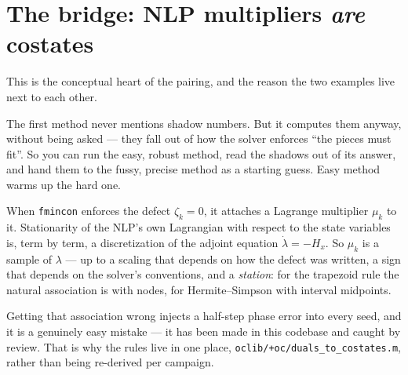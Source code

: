 \documentclass[11pt]{article}
\newcommand{\file}[1]{\texttt{#1}}
\begin{document}
\section{The bridge: NLP multipliers \emph{are} costates}\label{sec:bridge}

This is the conceptual heart of the pairing, and the reason the two examples
live next to each other.

\begin{eli}
The first method never mentions shadow numbers. But it computes them anyway,
without being asked --- they fall out of how the solver enforces ``the pieces
must fit''. So you can run the easy, robust method, read the shadows out of its
answer, and hand them to the fussy, precise method as a starting guess. Easy
method warms up the hard one.
\end{eli}

\begin{intu}
When \texttt{fmincon} enforces the defect $\zeta_k=0$, it attaches a Lagrange
multiplier $\mu_k$ to it. Stationarity of the NLP's own Lagrangian with respect
to the state variables is, term by term, a discretization of the adjoint
equation $\dot\lambda=-H_x$. So $\mu_k$ is a sample of $\lambda$ --- up to a
scaling that depends on how the defect was written, a sign that depends on the
solver's conventions, and a \emph{station}: for the trapezoid rule the natural
association is with nodes, for Hermite--Simpson with interval midpoints.

Getting that association wrong injects a half-step phase error into every seed,
and it is a genuinely easy mistake --- it has been made in this codebase and
caught by review. That is why the rules live in one place,
\file{oclib/+oc/duals\_to\_costates.m}, rather than being re-derived per campaign.
\end{intu}
\end{document}
